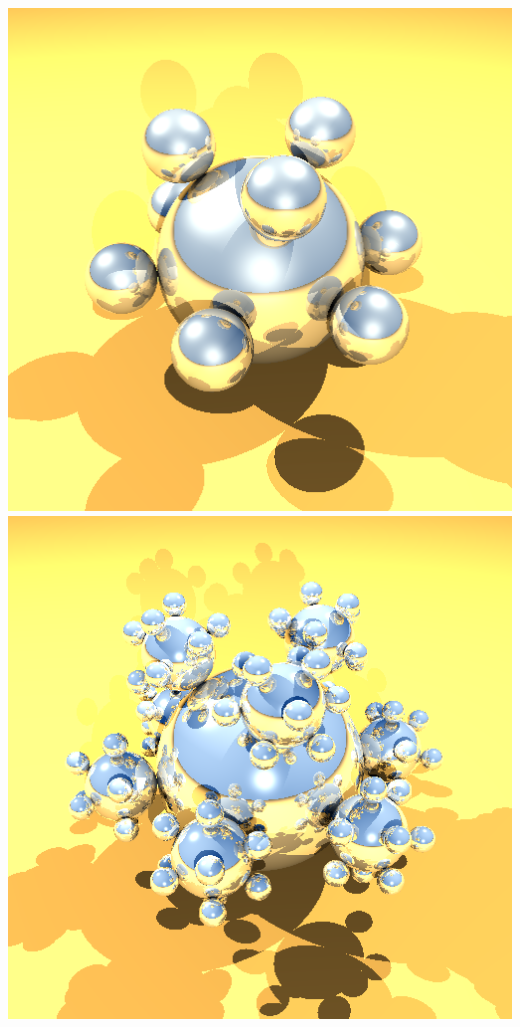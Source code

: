 \documentclass{article}
\begin{document}
        \begin{center}
            \includegraphics[scale=0.27]{deez_low}
            \includegraphics[scale=0.27]{deez_med} 

\end{center}
\end{document}
